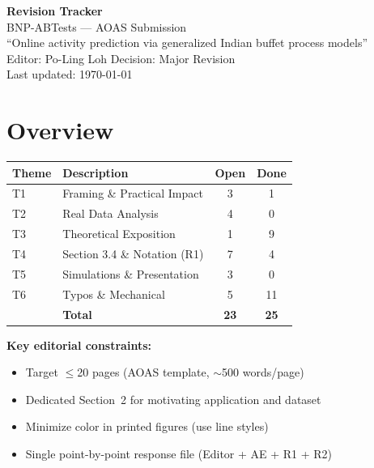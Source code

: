 \documentclass[11pt]{article}
\begin{document}
\begin{center}
  {\LARGE \textbf{Revision Tracker}} \\[0.5em]
  {\large BNP-ABTests --- AOAS Submission} \\[0.3em]
  {\normalsize ``Online activity prediction via generalized Indian buffet process models''} \\[0.3em]
  {\small Editor: Po-Ling Loh \quad Decision: Major Revision} \\[0.8em]
  {\small Last updated: \today}
\end{center}

\vspace{1em}

\section*{Overview}

\begin{center}
\begin{tabular}{llcc}
\toprule
\textbf{Theme} & \textbf{Description} & \textbf{Open} & \textbf{Done} \\
\midrule
T1 & Framing \& Practical Impact & 3 & 1 \\
T2 & Real Data Analysis & 4 & 0 \\
T3 & Theoretical Exposition & 1 & 9 \\
T4 & Section 3.4 \& Notation (R1) & 7 & 4 \\
T5 & Simulations \& Presentation & 3 & 0 \\
T6 & Typos \& Mechanical & 5 & 11 \\
\midrule
   & \textbf{Total} & \textbf{23} & \textbf{25} \\
\bottomrule
\end{tabular}
\end{center}

\vspace{0.5em}

\textbf{Key editorial constraints:}
\begin{itemize}[nosep]
  \item Target $\leq$20 pages (AOAS template, $\sim$500 words/page)
  \item Dedicated Section~2 for motivating application and dataset
  \item Minimize color in printed figures (use line styles)
  \item Single point-by-point response file (Editor + AE + R1 + R2)
\end{itemize}

\vspace{1.5em}







\end{document}
